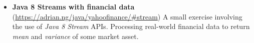 \documentclass[letterpaper,11pt]{article}
\newcommand{\resumeItem}[3]{
	\item\small{
		\textbf{#1}\hfill\tiny{#2\\}\small{ #3 \vspace{-2pt}}
	}
}
\newcommand{\resumeSubItem}[3]{\resumeItem{#1}{#2}{#3}\vspace{-2pt}}
\begin{document}
\begin{itemize}
{\begin{itemize}
	      \end{itemize}
	      }
	\item {
	      \textbf{Java 8 Streams with financial data}
	      \hfill
	      \tiny
	      (\href{https://adrian.ng/java/yahoofinance/\#stream}{https://adrian.ng/java/yahoofinance/\#stream})
	      \small
	      \newline
	      A small exercise involving the use of \textit{Java 8 Stream} APIs. Processing real-world financial data to return \textit{mean} and \textit{variance} of some market asset.
	      }
\end{itemize}


\newpage
\end{document}
